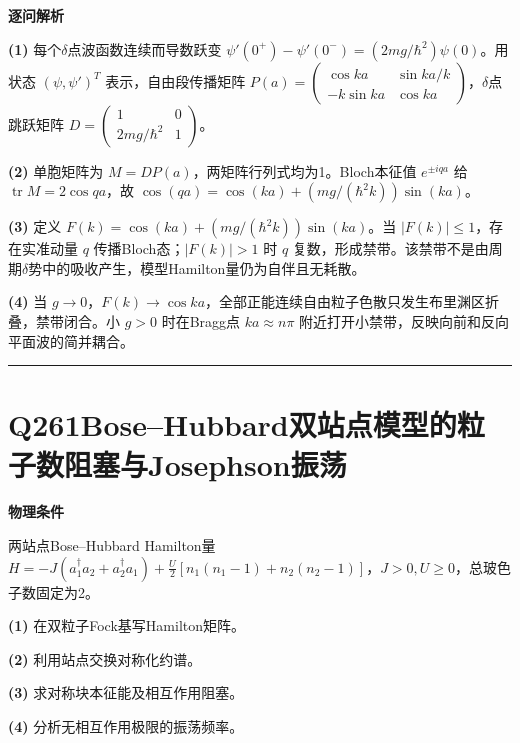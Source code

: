 \documentclass[UTF8,a4paper,11pt,oneside,openany]{ctexbook}
\begin{document}
\par\medskip\noindent\textbf{逐问解析}
\par\noindent\textbf{(1)} 每个\(\delta\)点波函数连续而导数跃变 \(\psi'(0^+)-\psi'(0^-)=(2mg/\hbar^2)\psi(0)\)。用状态 \((\psi,\psi')^T\) 表示，自由段传播矩阵 \(P(a)=\begin{pmatrix}\cos ka&\sin ka/k\\-k\sin ka&\cos ka\end{pmatrix}\)，\(\delta\)点跳跃矩阵 \(D=\begin{pmatrix}1&0\\2mg/\hbar^2&1\end{pmatrix}\)。
\par\noindent\textbf{(2)} 单胞矩阵为 \(M=DP(a)\)，两矩阵行列式均为1。Bloch本征值 \(e^{\pm iqa}\) 给 \(\operatorname{tr}M=2\cos qa\)，故 \(\cos(qa)=\cos(ka)+(mg/(\hbar^2k))\sin(ka)\)。
\par\noindent\textbf{(3)} 定义 \(F(k)=\cos(ka)+(mg/(\hbar^2k))\sin(ka)\)。当 \(|F(k)|\le1\)，存在实准动量 \(q\) 传播Bloch态；\(|F(k)|>1\) 时 \(q\) 复数，形成禁带。该禁带不是由周期\(\delta\)势中的吸收产生，模型Hamilton量仍为自伴且无耗散。
\par\noindent\textbf{(4)} 当 \(g\to0\)，\(F(k)\to\cos ka\)，全部正能连续自由粒子色散只发生布里渊区折叠，禁带闭合。小 \(g>0\) 时在Bragg点 \(ka\approx n\pi\) 附近打开小禁带，反映向前和反向平面波的简并耦合。

\par\bigskip\hrule\bigskip
\section*{Q261\quad Bose–Hubbard双站点模型的粒子数阻塞与Josephson振荡}
\textbf{物理条件}\par 两站点Bose–Hubbard Hamilton量 \(H=-J(a_1^\dagger a_2+a_2^\dagger a_1)+\frac U2[n_1(n_1-1)+n_2(n_2-1)]\)，\(J>0,U\ge0\)，总玻色子数固定为2。
\par\noindent\textbf{(1)} 在双粒子Fock基写Hamilton矩阵。
\par\noindent\textbf{(2)} 利用站点交换对称化约谱。
\par\noindent\textbf{(3)} 求对称块本征能及相互作用阻塞。
\par\noindent\textbf{(4)} 分析无相互作用极限的振荡频率。
\end{document}
